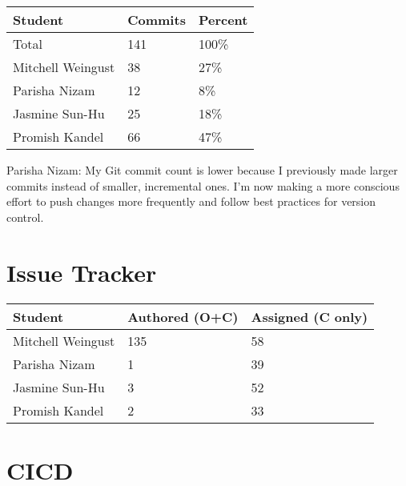\documentclass{article}
\begin{document}
\begin{table}[H]
\centering
\begin{tabular}{lll}
\toprule
\textbf{Student} & \textbf{Commits} & \textbf{Percent}\\
\midrule
Total & 141 & 100\% \\
Mitchell Weingust & 38 & 27\% \\
Parisha Nizam & 12 & 8\% \\
Jasmine Sun-Hu & 25 & 18\% \\
Promish Kandel & 66 & 47\% \\
\bottomrule
\end{tabular}
\end{table}

Parisha Nizam: My Git commit count is lower because I previously made larger commits instead of smaller, incremental ones. I'm now making a more conscious effort to push changes more frequently and follow best practices for version control.

\section{Issue Tracker}

\begin{table}[H]
\centering
\begin{tabular}{lll}
\toprule
\textbf{Student} & \textbf{Authored (O+C)} & \textbf{Assigned (C only)}\\
\midrule
Mitchell Weingust & 135 & 58 \\
Parisha Nizam & 1 & 39 \\
Jasmine Sun-Hu & 3 & 52 \\
Promish Kandel & 2 & 33 \\
\bottomrule
\end{tabular}
\end{table}


\section{CICD}
\end{document}
